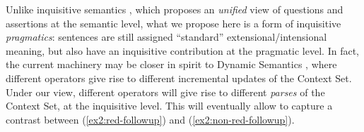 Unlike inquisitive semantics \citep{Mascarenhas2008,Ciardelli2009,Groenendijk2009,Ciardelli2018}, which proposes an \textit{unified} view of questions and assertions at the semantic level, what we propose here is a form of inquisitive \textit{pragmatics}: sentences are still assigned ``standard'' extensional/intensional meaning, but also have an inquisitive contribution at the pragmatic level. In fact, the current machinery may be closer in spirit to Dynamic Semantics \citep{Heim1983a,Heim1983b}, where different operators give rise to different incremental updates of the Context Set. Under our view, different operators will give rise to different \textit{parses} of the Context Set, at the inquisitive level. This will eventually allow to capture a contrast between (\ref{ex2:red-followup}) and (\ref{ex2:non-red-followup}).





